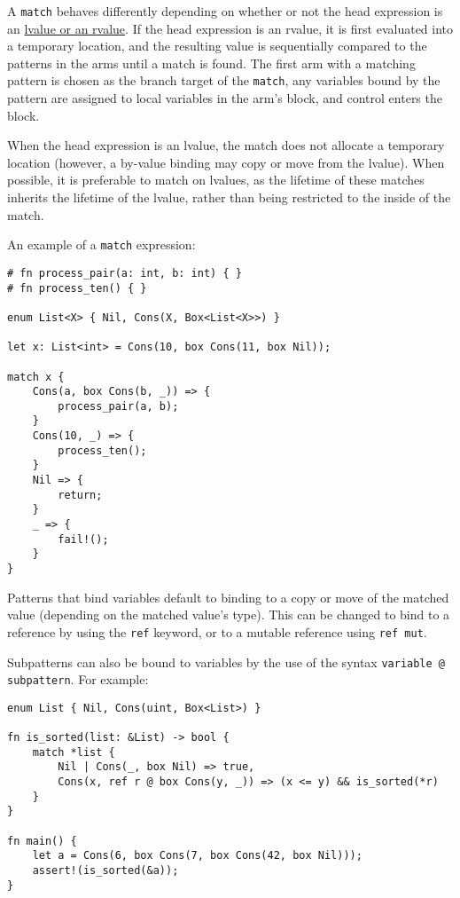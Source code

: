 \documentclass[]{article}
\begin{document}
A \texttt{match} behaves differently depending on whether or not the
head expression is an
\hyperref[lvaluesux2c-rvalues-and-temporaries]{lvalue or an rvalue}. If
the head expression is an rvalue, it is first evaluated into a temporary
location, and the resulting value is sequentially compared to the
patterns in the arms until a match is found. The first arm with a
matching pattern is chosen as the branch target of the \texttt{match},
any variables bound by the pattern are assigned to local variables in
the arm's block, and control enters the block.

When the head expression is an lvalue, the match does not allocate a
temporary location (however, a by-value binding may copy or move from
the lvalue). When possible, it is preferable to match on lvalues, as the
lifetime of these matches inherits the lifetime of the lvalue, rather
than being restricted to the inside of the match.

An example of a \texttt{match} expression:

\begin{verbatim}
# fn process_pair(a: int, b: int) { }
# fn process_ten() { }

enum List<X> { Nil, Cons(X, Box<List<X>>) }

let x: List<int> = Cons(10, box Cons(11, box Nil));

match x {
    Cons(a, box Cons(b, _)) => {
        process_pair(a, b);
    }
    Cons(10, _) => {
        process_ten();
    }
    Nil => {
        return;
    }
    _ => {
        fail!();
    }
}
\end{verbatim}

Patterns that bind variables default to binding to a copy or move of the
matched value (depending on the matched value's type). This can be
changed to bind to a reference by using the \texttt{ref} keyword, or to
a mutable reference using \texttt{ref mut}.

Subpatterns can also be bound to variables by the use of the syntax
\texttt{variable @ subpattern}. For example:

\begin{verbatim}
enum List { Nil, Cons(uint, Box<List>) }

fn is_sorted(list: &List) -> bool {
    match *list {
        Nil | Cons(_, box Nil) => true,
        Cons(x, ref r @ box Cons(y, _)) => (x <= y) && is_sorted(*r)
    }
}

fn main() {
    let a = Cons(6, box Cons(7, box Cons(42, box Nil)));
    assert!(is_sorted(&a));
}
\end{verbatim}
\end{document}
